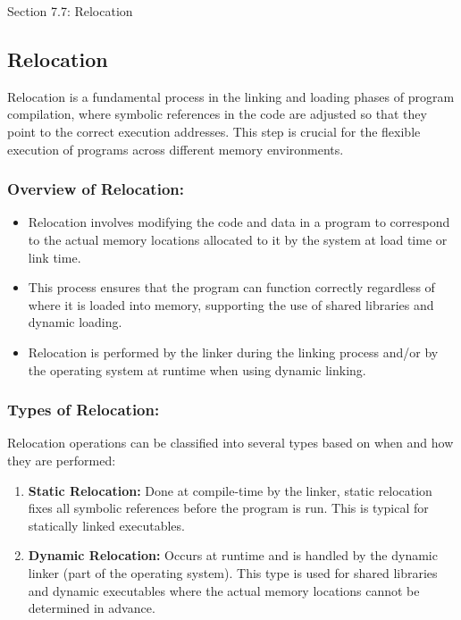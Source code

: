 \begin{notes}{Section 7.7: Relocation}
    \subsection*{Relocation}

    Relocation is a fundamental process in the linking and loading phases of program compilation, where symbolic references in the code are adjusted so that they point to the correct execution addresses. 
    This step is crucial for the flexible execution of programs across different memory environments. \vspace*{1em}
    
    \subsubsection*{Overview of Relocation:}
    
    \begin{itemize}
        \item Relocation involves modifying the code and data in a program to correspond to the actual memory locations allocated to it by the system at load time or link time.
        \item This process ensures that the program can function correctly regardless of where it is loaded into memory, supporting the use of shared libraries and dynamic loading.
        \item Relocation is performed by the linker during the linking process and/or by the operating system at runtime when using dynamic linking.
    \end{itemize}
    
    \subsubsection*{Types of Relocation:}
    
    Relocation operations can be classified into several types based on when and how they are performed:
    \begin{enumerate}
        \item \textbf{Static Relocation:} Done at compile-time by the linker, static relocation fixes all symbolic references before the program is run. This is typical for statically linked executables.
        \item \textbf{Dynamic Relocation:} Occurs at runtime and is handled by the dynamic linker (part of the operating system). This type is used for shared libraries and dynamic executables where 
        the actual memory locations cannot be determined in advance.
    \end{enumerate}
    

\end{notes}
